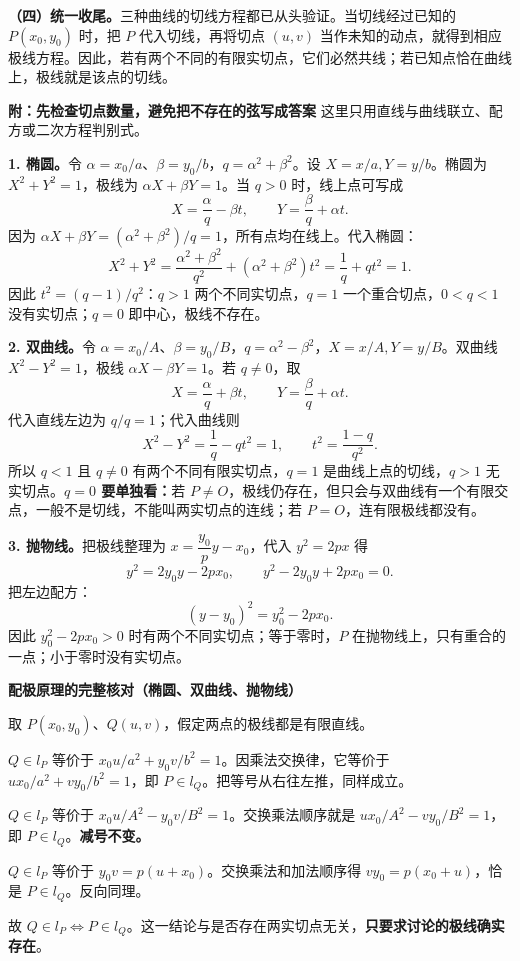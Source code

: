 \begin{proofbox}
\textbf{（四）统一收尾。}三种曲线的切线方程都已从头验证。当切线经过已知的 $P(x_0,y_0)$ 时，把 $P$ 代入切线，再将切点 $(u,v)$ 当作未知的动点，就得到相应极线方程。因此，若有两个不同的有限实切点，它们必然共线；若已知点恰在曲线上，极线就是该点的切线。

\medskip
\textbf{\textcolor{CProof}{附：先检查切点数量，避免把不存在的弦写成答案}}
这里只用直线与曲线联立、配方或二次方程判别式。

\textbf{1. 椭圆。}令 $\alpha=x_0/a$、$\beta=y_0/b$，$q=\alpha^2+\beta^2$。设 $X=x/a,Y=y/b$。椭圆为 $X^2+Y^2=1$，极线为 $\alpha X+\beta Y=1$。当 $q>0$ 时，线上点可写成
\[
X=\frac{\alpha}{q}-\beta t,\qquad Y=\frac{\beta}{q}+\alpha t.
\]
因为 $\alpha X+\beta Y=(\alpha^2+\beta^2)/q=1$，所有点均在线上。代入椭圆：
\[
X^2+Y^2=\frac{\alpha^2+\beta^2}{q^2}+(\alpha^2+\beta^2)t^2
=\frac1q+qt^2=1.
\]
因此 $t^2=(q-1)/q^2$：$q>1$ 两个不同实切点，$q=1$ 一个重合切点，$0<q<1$ 没有实切点；$q=0$ 即中心，极线不存在。

\textbf{2. 双曲线。}令 $\alpha=x_0/A$、$\beta=y_0/B$，$q=\alpha^2-\beta^2$，$X=x/A,Y=y/B$。双曲线 $X^2-Y^2=1$，极线 $\alpha X-\beta Y=1$。若 $q\ne0$，取
\[
X=\frac{\alpha}{q}+\beta t,\qquad Y=\frac{\beta}{q}+\alpha t.
\]
代入直线左边为 $q/q=1$；代入曲线则
\[
X^2-Y^2=\frac1q-qt^2=1,
\qquad t^2=\frac{1-q}{q^2}.
\]
所以 $q<1$ 且 $q\ne0$ 有两个不同有限实切点，$q=1$ 是曲线上点的切线，$q>1$ 无实切点。\textbf{$q=0$ 要单独看：}若 $P\ne O$，极线仍存在，但只会与双曲线有一个有限交点，一般不是切线，不能叫两实切点的连线；若 $P=O$，连有限极线都没有。

\textbf{3. 抛物线。}把极线整理为 $x=\dfrac{y_0}{p}y-x_0$，代入 $y^2=2px$ 得
\[
y^2=2y_0y-2px_0,\qquad y^2-2y_0y+2px_0=0.
\]
把左边配方：
\[
(y-y_0)^2=y_0^2-2px_0.
\]
因此 $y_0^2-2px_0>0$ 时有两个不同实切点；等于零时，$P$ 在抛物线上，只有重合的一点；小于零时没有实切点。

\medskip
\textbf{\textcolor{CProof}{配极原理的完整核对（椭圆、双曲线、抛物线）}}

\begin{center}\end{center}
取 $P(x_0,y_0)$、$Q(u,v)$，假定两点的极线都是有限直线。
\begin{description}[style=nextline,leftmargin=2em,itemsep=0.28em]
\item[椭圆：] $Q\in l_P$ 等价于 $x_0u/a^2+y_0v/b^2=1$。因乘法交换律，它等价于 $ux_0/a^2+vy_0/b^2=1$，即 $P\in l_Q$。把等号从右往左推，同样成立。
\item[双曲线：] $Q\in l_P$ 等价于 $x_0u/A^2-y_0v/B^2=1$。交换乘法顺序就是 $ux_0/A^2-vy_0/B^2=1$，即 $P\in l_Q$。\textbf{减号不变。}
\item[抛物线：] $Q\in l_P$ 等价于 $y_0v=p(u+x_0)$。交换乘法和加法顺序得 $vy_0=p(x_0+u)$，恰是 $P\in l_Q$。反向同理。
\end{description}
故 $Q\in l_P\iff P\in l_Q$。这一结论与是否存在两实切点无关，\textbf{只要求讨论的极线确实存在}。
\end{proofbox}
